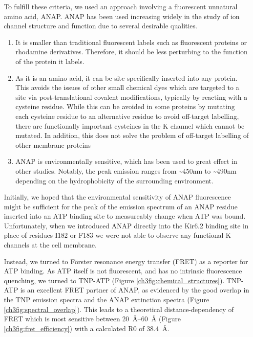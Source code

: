 To fulfill these criteria, we used an approach involving a fluorescent unnatural amino acid, ANAP.
ANAP has been used increasing widely in the study of ion channel structure and function due to several desirable qualities.

\begin{enumerate}
	\item It is smaller than traditional fluorescent labels such as fluorescent proteins or rhodamine derivatives.
	Therefore, it should be less perturbing to the function of the protein it labels.
	\item As it is an amino acid, it can be site-specifically inserted into any protein.
	This avoids the issues of other small chemical dyes which are targeted to a site via post-translational covalent modifications, typically by reacting with a cysteine residue.
	While this can be avoided in some proteins by mutating each cysteine residue to an alternative residue to avoid off-target labelling, there are functionally important cysteines in the K\ATP{} channel which cannot be mutated.
	In addition, this does not solve the problem of off-target labelling of other membrane proteins
	\item ANAP is environmentally sensitive, which has been used to great effect in other studies.
	Notably, the peak emission ranges from \textasciitilde450nm to \textasciitilde490nm depending on the hydrophobicity of the surrounding environment.
\end{enumerate}

Initially, we hoped that the environmental sensitivity of ANAP fluorescence might be sufficient for the peak of the emission spectrum of an ANAP residue inserted into an ATP binding site to measureably change when ATP was bound.
Unfortunately, when we introduced ANAP directly into the Kir6.2 binding site in place of residues I182 or F183 we were not able to observe any functional K\ATP{} channels at the cell membrane.

Instead, we turned to F\"{o}rster resonance energy transfer (FRET) as a reporter for ATP binding.
As ATP itself is not fluorescent, and has no intrinsic fluorescence quenching, we turned to TNP-ATP (Figure \ref{ch3fig:chemical_structures}).
TNP-ATP is an excellent FRET partner of ANAP, as evidenced by the good overlap in the TNP emission spectra and the ANAP extinction spectra (Figure \ref{ch3fig:spectral_overlap}).
This leads to a theoretical distance-dependency of FRET which is most sensitive between \SIrange{20}{60}{\angstrom} (Figure \ref{ch3fig:fret_efficiency}) with a calculated R0 of \SI{38.4}{\angstrom}.

